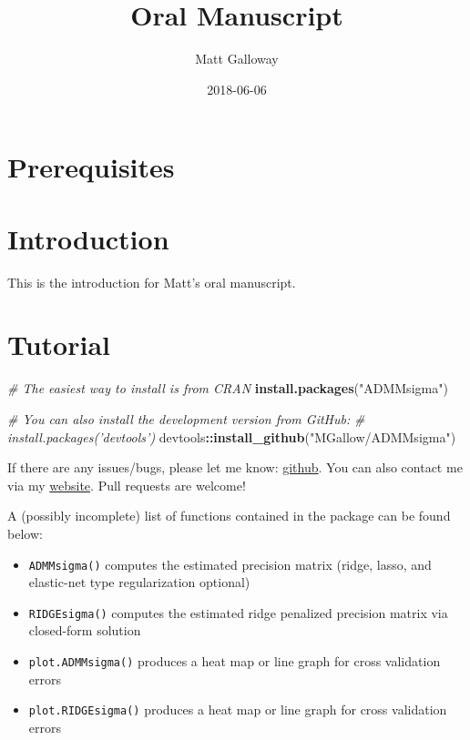 \documentclass[12pt,]{book}
\title{Oral Manuscript}
\author{Matt Galloway}
\date{2018-06-06}
\newenvironment{Shaded}{\begin{snugshade}}{\end{snugshade}}
\newcommand{\CommentTok}[1]{\textcolor[rgb]{0.56,0.35,0.01}{\textit{#1}}}
\newcommand{\KeywordTok}[1]{\textcolor[rgb]{0.13,0.29,0.53}{\textbf{#1}}}
\newcommand{\NormalTok}[1]{#1}
\newcommand{\OperatorTok}[1]{\textcolor[rgb]{0.81,0.36,0.00}{\textbf{#1}}}
\newcommand{\StringTok}[1]{\textcolor[rgb]{0.31,0.60,0.02}{#1}}
\theoremstyle{definition}
\theoremstyle{definition}
\theoremstyle{definition}
\theoremstyle{remark}
\begin{document}
\maketitle

{
\hypersetup{linkcolor=}
\setcounter{tocdepth}{2}
\tableofcontents
}
\hypertarget{prerequisites}{%
\chapter{Prerequisites}\label{prerequisites}}

\hypertarget{intro}{%
\chapter{Introduction}\label{intro}}

This is the introduction for Matt's oral manuscript.

\hypertarget{tutorial}{%
\chapter{Tutorial}\label{tutorial}}

\vspace{0.5cm}

\begin{Shaded}
\begin{Highlighting}[]
\CommentTok{# The easiest way to install is from CRAN}
\KeywordTok{install.packages}\NormalTok{(}\StringTok{"ADMMsigma"}\NormalTok{)}

\CommentTok{# You can also install the development version from GitHub:}
\CommentTok{# install.packages('devtools')}
\NormalTok{devtools}\OperatorTok{::}\KeywordTok{install_github}\NormalTok{(}\StringTok{"MGallow/ADMMsigma"}\NormalTok{)}
\end{Highlighting}
\end{Shaded}

\vspace{0.5cm}

If there are any issues/bugs, please let me know:
\href{https://github.com/MGallow/ADMMsigma/issues}{github}. You can also
contact me via my \href{https://mgallow.github.io/}{website}. Pull
requests are welcome!

\vspace{0.5cm}

A (possibly incomplete) list of functions contained in the package can
be found below:

\begin{itemize}
\item
  \texttt{ADMMsigma()} computes the estimated precision matrix (ridge,
  lasso, and elastic-net type regularization optional)
\item
  \texttt{RIDGEsigma()} computes the estimated ridge penalized precision
  matrix via closed-form solution
\item
  \texttt{plot.ADMMsigma()} produces a heat map or line graph for cross
  validation errors
\item
  \texttt{plot.RIDGEsigma()} produces a heat map or line graph for cross
  validation errors
\end{itemize}
\end{document}
